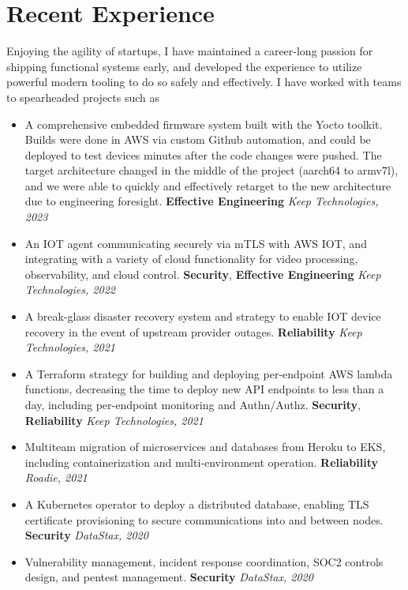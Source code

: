 \documentclass[letterpaper,10pt]{article}
\begin{document}
\section{Recent Experience}
Enjoying the agility of startups, I have maintained a
career-long passion for shipping functional systems early, and developed the experience to
utilize powerful modern tooling to do so safely and effectively. I have
worked with teams to spearheaded projects such as
\begin{itemize}
	\setlength\itemsep{0.1em} \item A comprehensive embedded firmware system
	      built with the Yocto toolkit. Builds were done in AWS via custom Github
	      automation, and could be deployed to test devices minutes after the code
	      changes were pushed. The target architecture
	      changed in the middle of the project (aarch64 to armv7l), and we were able to quickly and effectively retarget to the new architecture due to engineering foresight. \textbf{Effective Engineering} \textit{Keep Technologies, 2023}
	\item An IOT agent communicating securely via mTLS with AWS IOT, and integrating with a variety of cloud functionality for video processing, observability, and cloud control. \textbf{Security}, \textbf{Effective Engineering} \textit{Keep Technologies, 2022}
	\item A break-glass disaster recovery system and strategy to enable IOT device recovery in the event of upstream provider outages. \textbf{Reliability} \textit{Keep Technologies, 2021}
	\item A Terraform strategy for building and deploying per-endpoint AWS lambda functions, decreasing the time to deploy new API endpoints to less than a day, including per-endpoint monitoring and Authn/Authz. \textbf{Security}, \textbf{Reliability} \textit{Keep Technologies, 2021}
	\item Multiteam migration of microservices and databases from Heroku to EKS, including containerization and multi-environment operation. \textbf{Reliability} \textit{Roadie, 2021}
	\item A Kubernetes operator to deploy a distributed database, enabling TLS certificate provisioning to secure communications into and between nodes. \textbf{Security} \textit{DataStax, 2020}
	\item Vulnerability management, incident response coordination, SOC2 controls design, and pentest management. \textbf{Security} \textit{DataStax, 2020}
\end{itemize}
\end{document}
